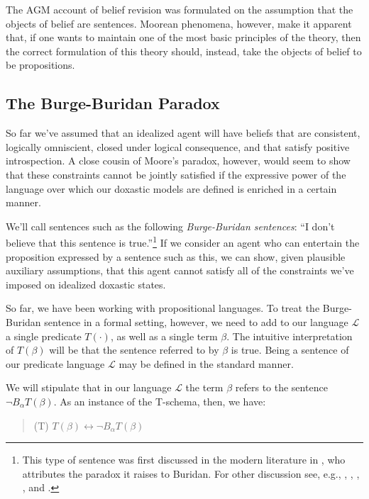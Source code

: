 The AGM account of belief revision was formulated on the assumption that the objects of belief are sentences.
Moorean phenomena, however, make it apparent that, if one wants to maintain one of the most basic principles of the theory, then the correct formulation of this theory should, instead, take the objects of belief to be propositions. 


\subsection{The Burge-Buridan Paradox}\label{caie-section4-2}

So far we've assumed that an idealized agent will have beliefs that are consistent, logically omniscient, closed under logical consequence, and that satisfy positive introspection.
A close cousin of Moore's paradox, however, would seem to show that these constraints cannot be jointly satisfied if the expressive power of the language over which our doxastic models are defined is enriched in a certain manner.


We'll call sentences such as the following \textit{Burge-Buridan sentences}: ``I don't believe that this sentence is true.''\footnote{This type of sentence was first discussed in the modern literature in \citet{Burge2}, who attributes the paradox it raises to Buridan. For other discussion see, e.g., \citet{Burge1}, \citet{Conee1}, \citet{Sorensen1}, \citet{Caie4}, and \citet{Caie2}.} If we consider an agent who can entertain the proposition expressed by a sentence such as this, we can show, given plausible auxiliary assumptions, that this agent cannot satisfy all of the constraints we've imposed on idealized doxastic states.

So far, we have been working with propositional languages.
To treat the Burge-Buridan sentence in a formal setting, however, we need to add to our language $\mathcal{L}$ a single predicate $T(\cdot)$, as well as a single term $ \beta$.
The intuitive interpretation of $T(\beta)$ will be that the sentence referred to by $ \beta$ is true.
Being a sentence of our predicate language $\mathcal{L}$ may be defined in the standard manner.

We will stipulate that in our language $\mathcal{L}$ the term $ \beta$ refers to the sentence $\lnot B_\alpha T(\beta)$.
As an instance of the T-schema, then, we have:
\begin{quote}
(T) \quad $T(\beta) \leftrightarrow \lnot B_\alpha T(\beta)$
\end{quote}

